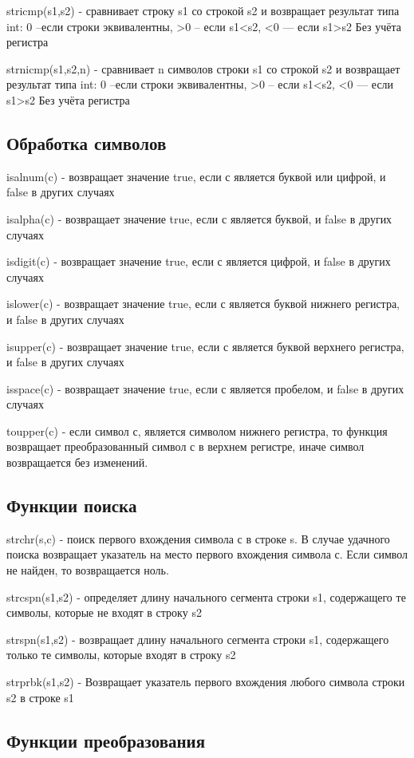 \documentclass[14pt, a4paper]{extarticle}
\begin{document}
stricmp(s1,s2) - сравнивает строку s1 со строкой s2 и возвращает результат типа int:
0 –если строки эквивалентны, >0 – если s1<s2,  <0  — если s1>s2 Без учёта регистра

strnicmp(s1,s2,n) - сравнивает n символов строки s1 со строкой s2 и возвращает результат типа int:
0 –если строки эквивалентны, >0 – если s1<s2,  <0 — если s1>s2 Без учёта регистра
\subsection*{Обработка символов}

isalnum(c) - возвращает значение true, если с является буквой или цифрой, и false в других случаях

isalpha(c) - возвращает значение true, если с является буквой,  и false в других случаях

isdigit(c) - возвращает значение true, если с является цифрой, и false в других случаях

islower(c) - возвращает значение true, если с является буквой нижнего регистра, и false в других случаях

isupper(c) - возвращает значение true, если с является буквой верхнего регистра, и false в других случаях

isspace(c) - возвращает значение true, если с является пробелом, и false в других случаях

toupper(c) - если символ с, является символом нижнего регистра, то функция возвращает преобразованный символ
с в верхнем регистре, иначе символ возвращается без изменений.
\subsection*{Функции поиска}

strchr(s,c) -  поиск первого вхождения символа с в строке s. В случае удачного поиска возвращает указатель
на место первого вхождения символа с. Если символ не найден, то возвращается ноль.

strcspn(s1,s2) - определяет длину начального сегмента строки s1, содержащего те символы, которые не входят в строку s2

strspn(s1,s2) - возвращает длину начального сегмента строки s1, содержащего только те символы, которые входят в строку s2

strprbk(s1,s2) - Возвращает указатель  первого вхождения любого символа строки s2 в строке s1

\subsection*{Функции преобразования}
\end{document}
